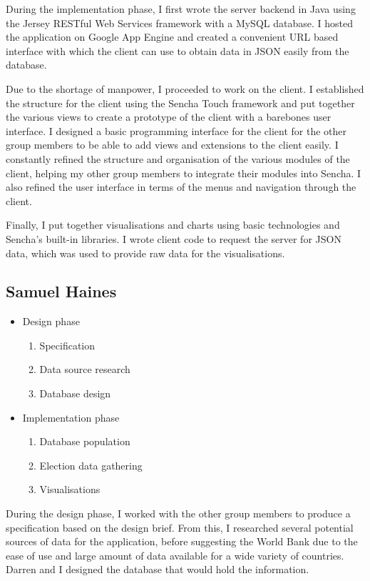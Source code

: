 \documentclass[12pt,a4paper,twoside]{article}
\begin{document}
During the implementation phase, I first wrote the server backend in Java using the Jersey RESTful Web Services framework with a MySQL database. I hosted the application on Google App Engine and created a convenient URL based interface with which the client can use to obtain data in JSON easily from the database.

Due to the shortage of manpower, I proceeded to work on the client. I established the structure for the client using the Sencha Touch framework and put together the various views to create a prototype of the client with a barebones user interface. I designed a basic programming interface for the client for the other group members to be able to add views and extensions to the client easily. I constantly refined the structure and organisation of the various modules of the client, helping my other group members to integrate their modules into Sencha. I also refined the user interface in terms of the menus and navigation through the client.

Finally, I put together visualisations and charts using basic technologies and Sencha’s built-in libraries. I wrote client code to request the server for JSON data, which was used to provide raw data for the visualisations.

\subsection{Samuel Haines}

\begin{itemize}
	\item Design phase
	\begin{enumerate}
		\item Specification
		\item Data source research
		\item Database design
	\end{enumerate}
	\item Implementation phase
	\begin{enumerate}
		\item Database population
		\item Election data gathering
		\item Visualisations
	\end{enumerate}
\end{itemize}

During the design phase, I worked with the other group members to produce a specification based on the design brief. From this, I researched several potential sources of data for the application, before suggesting the World Bank due to the ease of use and large amount of data available for a wide variety of countries. Darren and I designed the database that would hold the information.
\end{document}
